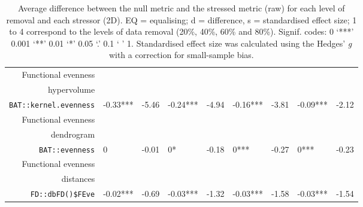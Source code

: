 \begin{table}[ht]
\begin{tabular}{rllllllll}
  Functional evenness\\ hypervolume\\ \texttt{BAT::kernel.evenness} & -0.33*** & -5.46 & -0.24*** & -4.94 & -0.16*** & -3.81 & -0.09*** & -2.12 \\ 
  Functional evenness\\ dendrogram\\ \texttt{BAT::evenness} & 0 & -0.01 & 0* & -0.18 & 0*** & -0.27 & 0*** & -0.23 \\ 
  Functional evenness\\ distances\\ \texttt{FD::dbFD()\$FEve} & -0.02*** & -0.69 & -0.03*** & -1.32 & -0.03*** & -1.58 & -0.03*** & -1.54 \\ 
   \hline
\end{tabular}
\caption{Average difference between the null metric and the stressed metric (raw) for each level of removal and each stressor (2D). EQ = equalising; d = difference, s = standardised effect size; 1 to 4 correspond to the levels of data removal (20\%, 40\%, 60\% and 80\%). Signif. codes:  0 ‘***’ 0.001 ‘**’ 0.01 ‘*’ 0.05 ‘.’ 0.1 ‘ ’ 1. Standardised effect size was calculated using the Hedges' \textit{g} with a correction for small-sample bias.} 
\end{table}
